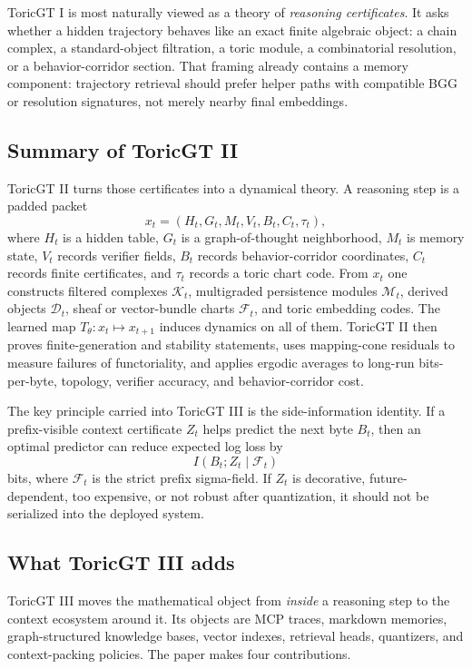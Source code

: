 \documentclass[11pt]{article}
\newcommand{\calK}{\mathcal{K}}
\newcommand{\calM}{\mathcal{M}}
\newcommand{\calD}{\mathcal{D}}
\newcommand{\calF}{\mathcal{F}}
\numberwithin{equation}{section}
\begin{document}
ToricGT I is most naturally viewed as a theory of \emph{reasoning certificates}. It asks whether a hidden trajectory behaves like an exact finite algebraic object: a chain complex, a standard-object filtration, a toric module, a combinatorial resolution, or a behavior-corridor section. That framing already contains a memory component: trajectory retrieval should prefer helper paths with compatible BGG or resolution signatures, not merely nearby final embeddings.

\subsection{Summary of ToricGT II}
ToricGT II turns those certificates into a dynamical theory. A reasoning step is a padded packet
\begin{equation}
 x_t=(H_t, G_t, M_t, V_t, B_t, C_t, \tau_t),
\end{equation}
where $H_t$ is a hidden table, $G_t$ is a graph-of-thought neighborhood, $M_t$ is memory state, $V_t$ records verifier fields, $B_t$ records behavior-corridor coordinates, $C_t$ records finite certificates, and $\tau_t$ records a toric chart code. From $x_t$ one constructs filtered complexes $\calK_t$, multigraded persistence modules $\calM_t$, derived objects $\calD_t$, sheaf or vector-bundle charts $\calF_t$, and toric embedding codes. The learned map $T_\theta:x_t\mapsto x_{t+1}$ induces dynamics on all of them. ToricGT II then proves finite-generation and stability statements, uses mapping-cone residuals to measure failures of functoriality, and applies ergodic averages to long-run bits-per-byte, topology, verifier accuracy, and behavior-corridor cost.

The key principle carried into ToricGT III is the side-information identity. If a prefix-visible context certificate $Z_t$ helps predict the next byte $B_t$, then an optimal predictor can reduce expected log loss by
\begin{equation}
 I(B_t;Z_t\mid \mathcal{F}_t)
\end{equation}
bits, where $\mathcal{F}_t$ is the strict prefix sigma-field. If $Z_t$ is decorative, future-dependent, too expensive, or not robust after quantization, it should not be serialized into the deployed system.

\subsection{What ToricGT III adds}
ToricGT III moves the mathematical object from \emph{inside} a reasoning step to the context ecosystem around it. Its objects are MCP traces, markdown memories, graph-structured knowledge bases, vector indexes, retrieval heads, quantizers, and context-packing policies. The paper makes four contributions.
\end{document}
